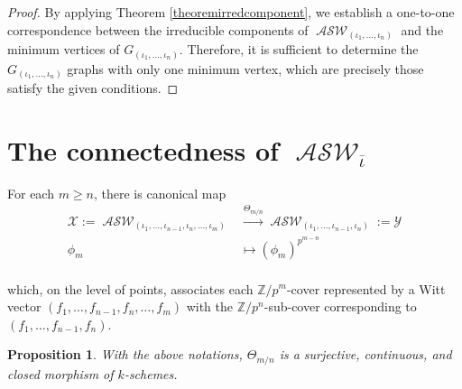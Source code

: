 \documentclass{compositio}
\newtheorem{proposition}[theorem]{Proposition}
\theoremstyle{remark}
\theoremstyle{remark}
\DeclareMathOperator{\ASW}{\mathcal{ASW}}
\begin{document}
\begin{proof}
By applying Theorem \ref{theoremirredcomponent}, we establish a one-to-one correspondence between the irreducible components of $\ASW_{({\iota_1, \ldots, \iota_n})}$ and the minimum vertices of $G_{({\iota_1, \ldots, \iota_n})}$. Therefore, it is sufficient to determine the $G_{({\iota_1, \ldots, \iota_n})}$ graphs with only one minimum vertex, which are precisely those satisfy the given conditions.
\end{proof}

\section{The connectedness of \texorpdfstring{$\ASW_{\overline{\iota}}$}{}}
\label{secconnectedness}



For each $m\ge n$, there is canonical map
\begin{equation*}
\begin{split}
     \mathscr{X}:= \ASW_{(\iota_1, \ldots, \iota_{n-1}, \iota_n, \ldots, \iota_m)} & \xrightarrow{\Theta_{m/n}} \ASW_{(\iota_1, \ldots, 
     \iota_{n-1}, \iota_n)}:=\mathscr{Y}\\
    \phi_m & \longmapsto{} (\phi_m)^{p^{m-n}}  \\
\end{split}
\end{equation*}

which, on the level of points, associates each $\mathbb{Z}/p^m$-cover represented by a Witt vector $(f_1, \ldots, f_{n-1},\allowbreak f_n, \ldots, f_m)$ with the $\mathbb{Z}/p^n$-sub-cover corresponding to $(f_1, \ldots, f_{n-1},\allowbreak f_n)$.


\begin{proposition}
With the above notations, $\Theta_{m/n}$ is a surjective, continuous, and closed morphism of $k$-schemes.
\end{proposition}
\end{document}
